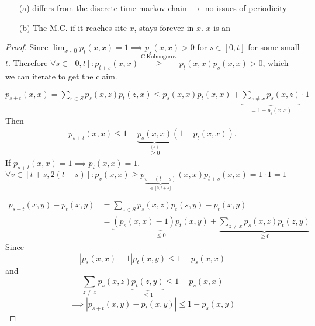 \begin{remark}
    \begin{enumerate}
        \item[(a)] differs from the discrete time markov chain \(\to\) no issues of periodicity 
        \item[(b)] The M.C. if it reaches site \(x\), stays forever in \(x\). \(x\) is an 
    \end{enumerate}
\end{remark}

\begin{proof}
     Since \(\lim_{x\downarrow 0}p_t(x,x)=1\implies p_s(x,x)>0\) for \(s \in [0,t]\) for some small \(t\).
    Therefore \(\forall s\in[0,t]:p_{t+s}(x,x)\stackrel{\text{C.Kolmogorov}}{\geq}p_t(x,x)p_s(x,x)>0\), which we can iterate to get the claim. 
   
     \(p_{s+t}(x,x)=\sum_{z\in S} p_s(x,z)p_t(z,x)\leq p_s(x,x)p_t(x,x)+\underbrace{\sum_{z\neq x}p_s(x,z)}_{=1-p_s(x,x)}\cdot 1\)
    Then \begin{align*}
        p_{s+t}(x,x)\leq 1-\underbrace{p_s(x,x)}_{\stackrel{(a)}{\geq 0}}(1-p_t(x,x)).
    \end{align*}
    If \(p_{s+t}(x,x)=1\implies p_t(x,x)=1\). \(\forall v\in [t+s,2(t+s)]: p_v(x,x)\geq p_{\underbrace{v-(t+s)}_{\in [0,t+s]}}(x,x)p_{t+s}(x,x)=1\cdot 1=1\)
    
     \begin{align*}
        p_{s+t}(x,y)-p_t(x,y)&=\sum_{z\in S}p_s(x,z)p_t(s,y)-p_t(x,y)\\
        &=\underbrace{(p_s(x,x)-1)p_t(x,y)}_{\leq 0}+\underbrace{\sum_{z\neq x}p_s(x,z)p_t(z,y)}_{\geq 0}
    \end{align*}
    Since \[|p_s(x,x)-1|p_t(x,y)\leq 1-p_s(x,x)\] and\[\sum_{z\neq x}p_s(x,z)\underbrace{p_t(z,y)}_{\leq 1}\leq 1-p_s(x,x)\]
    \[\implies |p_{s+t}(x,y)-p_t(x,y)|\leq 1-p_s(x,y)\]
\end{proof}

